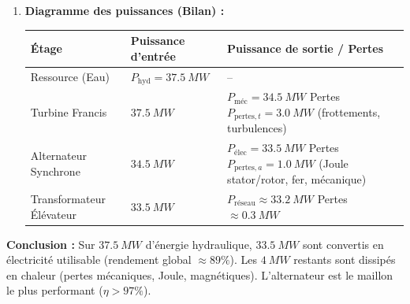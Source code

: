 \documentclass[11pt]{article}
\begin{document}
\begin{exoresolu}
\begin{enumerate}
    \item \textbf{Diagramme des puissances (Bilan) :}
    \begin{center}
    \begin{tabularx}{\linewidth}{|l|X|X|}\hline
    \rowcolor{popblueL} \textbf{Étage} & \textbf{Puissance d'entrée} & \textbf{Puissance de sortie / Pertes} \\ \hline
    Ressource (Eau) & $P_{\text{hyd}} = \SI{37,5}{MW}$ & -- \\ \hline
    Turbine Francis & $\SI{37,5}{MW}$ & $P_{\text{méc}} = \SI{34,5}{MW}$ \newline Pertes $P_{\text{pertes},t} = \SI{3,0}{MW}$ (frottements, turbulences) \\ \hline
    Alternateur Synchrone & $\SI{34,5}{MW}$ & $P_{\text{élec}} = \SI{33,5}{MW}$ \newline Pertes $P_{\text{pertes},a} = \SI{1,0}{MW}$ (Joule stator/rotor, fer, mécanique) \\ \hline
    Transformateur Élévateur & $\SI{33,5}{MW}$ & $P_{\text{réseau}} \approx \SI{33,2}{MW}$ \newline Pertes $\approx \SI{0,3}{MW}$ \\ \hline
    \end{tabularx}
    \end{center}
\end{enumerate}
\par\medskip\noindent\textbf{Conclusion :} Sur $\SI{37,5}{MW}$ d'énergie hydraulique, $\SI{33,5}{MW}$ sont convertis en électricité utilisable (rendement global $\approx 89\%$). Les $\SI{4}{MW}$ restants sont dissipés en chaleur (pertes mécaniques, Joule, magnétiques). L'alternateur est le maillon le plus performant ($\eta > 97\%$).
\end{exoresolu}
\end{document}
